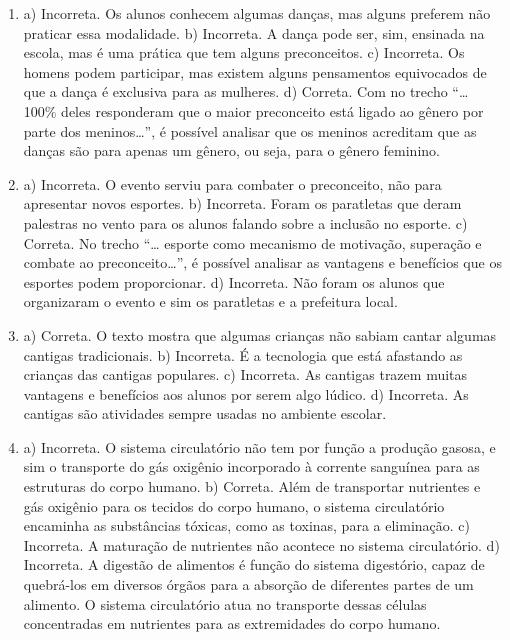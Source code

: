 \begin{enumerate}
\item
a) Incorreta. Os alunos conhecem algumas danças, mas alguns preferem não praticar essa modalidade.
b) Incorreta. A dança pode ser, sim, ensinada na escola, mas é uma
prática que tem alguns preconceitos.
c) Incorreta. Os homens podem participar, mas existem alguns
pensamentos equivocados de que a dança é exclusiva para as mulheres.
d) Correta. Com no trecho “\ldots{} 100\% deles responderam que o maior
preconceito está ligado ao gênero por parte dos meninos\ldots{}”, é possível
analisar que os meninos acreditam que as danças são para apenas um
gênero, ou seja, para o gênero feminino.

\item
a) Incorreta. O evento serviu para combater o preconceito, não
para apresentar novos esportes.
b) Incorreta. Foram os paratletas que deram palestras no vento
para os alunos falando sobre a inclusão no esporte.
c) Correta. No trecho “\ldots{} esporte como mecanismo de motivação,
superação e combate ao preconceito\ldots{}”, é possível analisar as vantagens
e benefícios que os esportes podem proporcionar.
d) Incorreta. Não foram os alunos que organizaram o evento e sim
os paratletas e a prefeitura local.

\item
a) Correta. O texto mostra que algumas crianças não sabiam cantar
algumas cantigas tradicionais.
b) Incorreta. É a tecnologia que está afastando as crianças das
cantigas populares.
c) Incorreta. As cantigas trazem muitas vantagens e benefícios
aos alunos por serem algo lúdico.
d) Incorreta. As cantigas são atividades sempre usadas no ambiente escolar.

\item
a) Incorreta. O sistema circulatório não tem por função a produção
gasosa, e sim o transporte do gás oxigênio incorporado à corrente
sanguínea para as estruturas do corpo humano.
b) Correta. Além de transportar nutrientes e gás oxigênio para os
tecidos do corpo humano, o sistema circulatório encaminha as substâncias
tóxicas, como as toxinas, para a eliminação.
c) Incorreta. A maturação de nutrientes não acontece no sistema
circulatório.
d) Incorreta. A digestão de alimentos é função do sistema digestório,
capaz de quebrá-los em diversos órgãos para a absorção de diferentes
partes de um alimento. O sistema circulatório atua no transporte dessas
células concentradas em nutrientes para as extremidades do corpo humano.


\end{enumerate}
